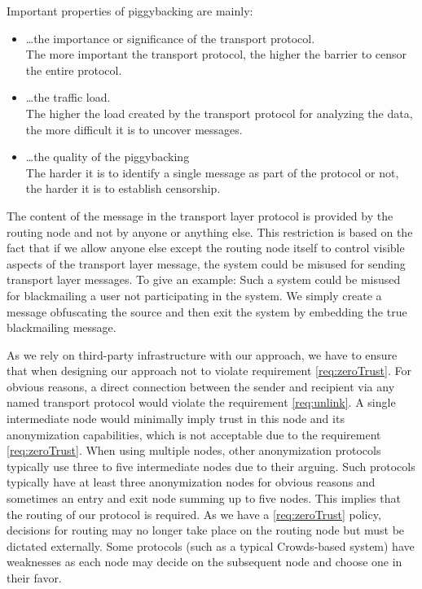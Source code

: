 Important properties of piggybacking are mainly:
\begin{itemize}
	\item \ldots the importance or significance of the transport protocol.\\
	The more important the transport protocol, the higher the barrier to censor the entire protocol.
	\item \ldots the traffic load.\\
	The higher the load created by the transport protocol for analyzing the data, the more difficult it is to uncover messages.
	\item \ldots the quality of the piggybacking\\
	The harder it is to identify a single message as part of the protocol or not, the harder it is to establish censorship.
\end{itemize} 

The content of the message in the transport layer protocol is provided by the routing node and not by anyone or anything else. This restriction is based on the fact that if we allow anyone else except the routing node itself to control visible aspects of the transport layer message, the system could be misused for sending transport layer messages. To give an example: Such a system could be misused for blackmailing a user not participating in the system. We simply create a message obfuscating the source and then exit the system by embedding the true blackmailing message. 

As we rely on third-party infrastructure with our approach, we have to ensure that when designing our approach not to violate requirement \ref{req:zeroTrust}. For obvious reasons, a direct connection between the sender and recipient via any named transport protocol would violate the requirement \ref{req:unlink}. A single intermediate node would minimally imply trust in this node and its anonymization capabilities, which is not acceptable due to the requirement \ref{req:zeroTrust}. When using multiple nodes, other anonymization protocols typically use three to five intermediate nodes due to their arguing. Such protocols typically have at least three anonymization nodes for obvious reasons and sometimes an entry and exit node summing up to five nodes. This implies that the routing of our protocol is required. As we have a \ref{req:zeroTrust} policy, decisions for routing may no longer take place on the routing node but must be dictated externally. Some protocols (such as a typical Crowds-based system) have weaknesses as each node may decide on the subsequent node and choose one in their favor.

